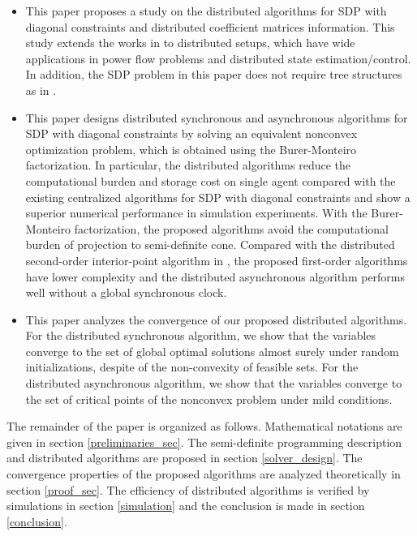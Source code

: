 \documentclass[journal]{IEEEtran}
\newcommand{\upcite}[1]{\textsuperscript{\textsuperscript{\cite{#1}}}}
\begin{document}
\begin{itemize}
\item This paper proposes a study on the distributed algorithms for SDP with diagonal constraints and distributed  coefficient matrices information. This study extends the works in \cite{BM_SPLR,BM_smooth,wang2017mixing,erdogdu2018convergence} to distributed setups, which have wide applications in power flow problems\upcite{ADMM_CDC,smart_admm} and distributed state estimation/control\upcite{semi_power,ricatti_zeng}. In addition, the SDP problem in this paper does not require tree structures as in \cite{dis_pd}.
\item This paper  designs distributed synchronous and asynchronous algorithms for SDP with diagonal constraints by solving an equivalent nonconvex optimization problem, which is obtained using the Burer-Monteiro factorization. %
In particular, the distributed algorithms reduce the computational burden and storage  cost on single agent compared with the existing centralized algorithms\cite{wang2017mixing,erdogdu2018convergence} for SDP with diagonal constraints and show a superior numerical performance in simulation experiments. With the Burer-Monteiro factorization, the proposed algorithms avoid the computational burden of projection to semi-definite cone\upcite{ADMM_CDC,fast_dis,semi_power,asyn_admm}. Compared with the distributed second-order interior-point algorithm in \cite{dis_pd}, the proposed first-order algorithms have lower complexity and the distributed asynchronous algorithm performs well without a global synchronous clock. 
\item This paper analyzes the convergence of our proposed distributed algorithms. For the distributed synchronous algorithm, we show that the variables converge to the set of global optimal solutions almost surely under random initializations, despite of
the non-convexity of feasible sets. For the distributed asynchronous algorithm, we show that the variables converge to the set of critical points of the nonconvex problem under mild conditions.
\end{itemize}
 \par The remainder of the paper is organized as follows. Mathematical notations are given in section \ref{preliminaries_sec}. The semi-definite programming description and distributed algorithms are proposed in section \ref{solver_design}. The convergence properties of the proposed algorithms are analyzed theoretically in section \ref{proof_sec}. The efficiency of distributed algorithms is verified by simulations in section \ref{simulation} and the conclusion is made in section \ref{conclusion}.
\end{document}
